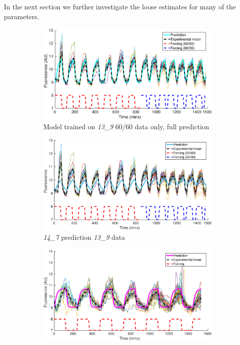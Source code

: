 \documentclass[10pt,journal]{./IEEE_latex_class/IEEEtran}
\begin{document}
In the next section we further investigate the loose estimates for many of the parameters.
 
 \begin{figure}[h!]	
 	\begin{subfigure}[h]{0.49\textwidth}
    \centering
        \includegraphics[scale = 0.3,clip = true, trim = 70 0 70 0]{13_9_partial_data_13_9_pred}
        \caption{Model trained on \textit{13\_9}  60/60 data only, full prediction}
        \label{CrossValidation_1} 
    \end{subfigure}
	\begin{subfigure}[h]{0.49\textwidth}
    \centering
        \includegraphics[scale = 0.3,clip = true, trim = 70 0 70 0]{14_7_pred_13_9_data}
        \caption{\textit{14\_7} prediction \textit{13\_9} data}
        \label{CrossValidation_2} 
    \end{subfigure}
    \begin{subfigure}[h]{0.49\textwidth}
    \centering
        \includegraphics[scale = 0.3,clip = true, trim = 70 0 70 0]{13_9_pred_14_7_data}

\end{subfigure}
\end{figure}
\end{document}
